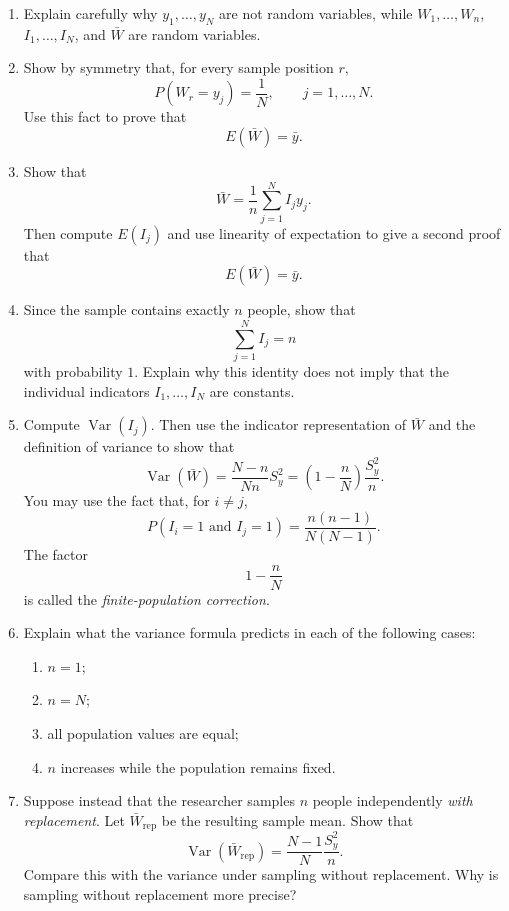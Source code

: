 \documentclass[11pt]{article}
\begin{document}
\begin{enumerate}[label=(\alph*), leftmargin=*]

\item Explain carefully why \(y_1,\dots,y_N\) are not random variables, while
\(W_1,\dots,W_n\), \(I_1,\dots,I_N\), and \(\bar W\) are random variables.

\item Show by symmetry that, for every sample position \(r\),
\[
P(W_r=y_j)=\frac{1}{N},
\qquad j=1,\dots,N.
\]
Use this fact to prove that
\[
E(\bar W)=\bar y.
\]

\item Show that
\[
\bar W=\frac{1}{n}\sum_{j=1}^N I_jy_j.
\]
Then compute \(E(I_j)\) and use linearity of expectation to give a second proof
that
\[
E(\bar W)=\bar y.
\]

\item Since the sample contains exactly \(n\) people, show that
\[
\sum_{j=1}^N I_j=n
\]
with probability \(1\). Explain why this identity does not imply that the
individual indicators \(I_1,\dots,I_N\) are constants.



\item Compute \(\operatorname{Var}(I_j)\). Then use the indicator
representation of \(\bar W\) and the definition of variance to show that
\[
\operatorname{Var}(\bar W)
=
\frac{N-n}{Nn}S_y^2
=
\left(1-\frac{n}{N}\right)\frac{S_y^2}{n}.
\]
You may use the fact that, for \(i\neq j\),
\[
P(I_i=1 \text{ and } I_j=1)
=
\frac{n(n-1)}{N(N-1)}.
\]
The factor
\[
1-\frac{n}{N}
\]
is called the \emph{finite-population correction}.





 

\item Explain what the variance formula predicts in each of the following
cases:
\begin{enumerate}[label=(\roman*), leftmargin=2em]
    \item \(n=1\);
    \item \(n=N\);
    \item all population values are equal;
    \item \(n\) increases while the population remains fixed.
\end{enumerate}

\item Suppose instead that the researcher samples \(n\) people independently
\emph{with replacement}. Let \(\bar W_{\mathrm{rep}}\) be the resulting sample
mean. Show that
\[
\operatorname{Var}(\bar W_{\mathrm{rep}})
=
\frac{N-1}{N}\frac{S_y^2}{n}.
\]
Compare this with the variance under sampling without replacement. Why is
sampling without replacement more precise?


\end{enumerate}
\end{document}
